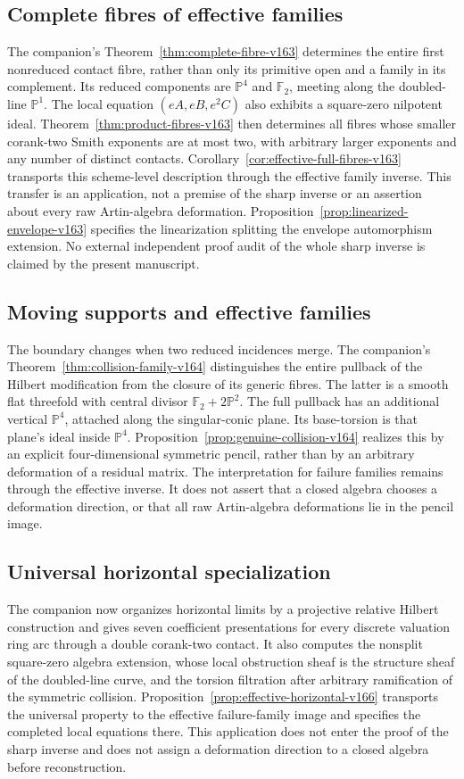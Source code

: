 \documentclass[11pt,reqno]{amsart}
\numberwithin{equation}{section}
\theoremstyle{definition}\newtheorem{definition}[theorem]{Definition}
\theoremstyle{remark}\newtheorem{remark}[theorem]{Remark}
\newcommand{\Pj}{\mathbb P}\newcommand{\A}{\mathbb A}
\begin{document}
\subsection{Complete fibres of effective families}
The companion's Theorem~\ref{thm:complete-fibre-v163} determines the
entire first nonreduced contact fibre, rather than only its primitive
open and a family in its complement. Its reduced components are
$\Pj^4$ and $\mathbb F_2$, meeting along the doubled-line
$\Pj^1$. The local equation $(eA,eB,e^2C)$ also exhibits a
square-zero nilpotent ideal. Theorem~\ref{thm:product-fibres-v163}
then determines all fibres whose smaller corank-two Smith exponents
are at most two, with arbitrary larger exponents and any number
of distinct contacts. Corollary~\ref{cor:effective-full-fibres-v163}
transports this scheme-level description through the effective
family inverse. This transfer is an application, not a premise
of the sharp inverse or an assertion about every raw Artin-algebra
deformation. Proposition~\ref{prop:linearized-envelope-v163}
specifies the linearization splitting the envelope automorphism
extension. No external independent proof audit of the whole sharp
inverse is claimed by the present manuscript.

\subsection{Moving supports and effective families}
The boundary changes when two reduced incidences merge. The
companion's Theorem~\ref{thm:collision-family-v164} distinguishes
the entire pullback of the Hilbert modification from the closure
of its generic fibres. The latter is a smooth flat threefold with
central divisor $\mathbb F_2+2\Pj^2$. The full pullback has an
additional vertical $\Pj^4$, attached along the singular-conic
plane. Its base-torsion is that plane's ideal inside $\Pj^4$.
Proposition~\ref{prop:genuine-collision-v164} realizes this by an
explicit four-dimensional symmetric pencil, rather than by an
arbitrary deformation of a residual matrix. The interpretation for
failure families remains through the effective inverse. It does
not assert that a closed algebra chooses a deformation direction,
or that all raw Artin-algebra deformations lie in the pencil image.

\subsection{Universal horizontal specialization}
The companion now organizes horizontal limits by a projective
relative Hilbert construction and gives seven coefficient
presentations for every discrete valuation ring arc through a
double corank-two contact. It also computes the nonsplit
square-zero algebra extension, whose local obstruction sheaf is
the structure sheaf of the doubled-line curve, and the torsion
filtration after arbitrary ramification of the symmetric collision.
Proposition~\ref{prop:effective-horizontal-v166} transports the
universal property to the effective failure-family image and
specifies the completed local equations there. This application
does not enter the proof of the sharp inverse and does not assign
a deformation direction to a closed algebra before reconstruction.
\end{document}
